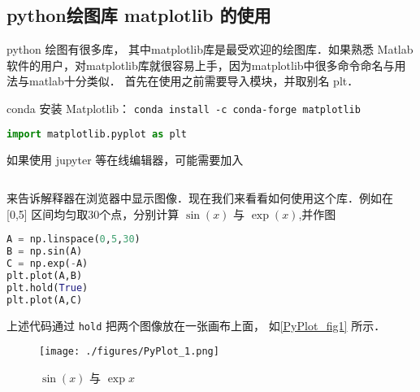 
\subsection{python绘图库 matplotlib 的使用}

python 绘图有很多库， 其中matplotlib库是最受欢迎的绘图库．如果熟悉 Matlab 软件的用户，对matplotlib库就很容易上手，因为matplotlib中很多命令命名与用法与matlab十分类似． 首先在使用之前需要导入模块，并取别名 plt．

conda 安装 Matplotlib： \verb|conda install -c conda-forge matplotlib|

\begin{lstlisting}[language=python]
import matplotlib.pyplot as plt
\end{lstlisting}
如果使用 jupyter 等在线编辑器，可能需要加入
\begin{lstlisting}[language=python]
% matplotlib inline
\end{lstlisting}
来告诉解释器在浏览器中显示图像．现在我们来看看如何使用这个库．例如在 [0,5] 区间均匀取30个点，分别计算 $\sin(x)$ 与 $\exp(x)$,并作图
\begin{lstlisting}[language=python]
A = np.linspace(0,5,30) 
B = np.sin(A)
C = np.exp(-A)
plt.plot(A,B)
plt.hold(True)
plt.plot(A,C)
\end{lstlisting}
上述代码通过 \verb|hold| 把两个图像放在一张画布上面， 如\autoref{PyPlot_fig1} 所示．
\begin{figure}[ht]
\centering
\texttt{[image: ./figures/PyPlot\_1.png]}
\caption{$\sin(x)$ 与 $\exp{x}$} \label{PyPlot_fig1}
\end{figure}


